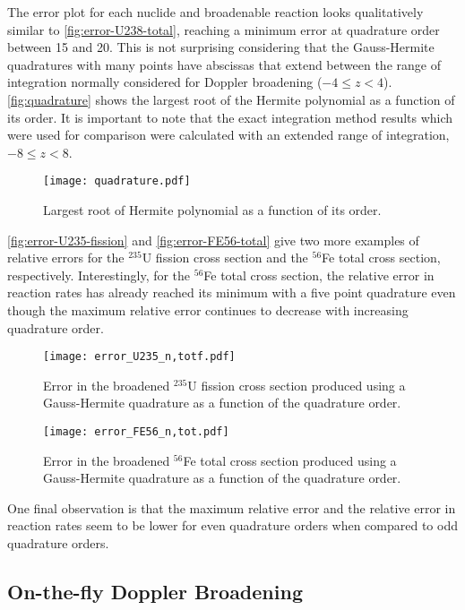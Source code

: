\documentclass[3p,authoryear]{elsarticle}
\begin{document}
The error plot for each nuclide and broadenable reaction looks qualitatively
similar to \autoref{fig:error-U238-total}, reaching a minimum error at
quadrature order between 15 and 20. This is not surprising considering that the
Gauss-Hermite quadratures with many points have abscissas that extend between
the range of integration normally considered for Doppler broadening ($-4 \le z <
4$). \autoref{fig:quadrature} shows the largest root of the Hermite polynomial
as a function of its order. It is important to note that the exact integration
method results which were used for comparison were calculated with an extended
range of integration, $-8 \le z < 8$.
\begin{figure}[H]
  \centering
  \texttt{[image: quadrature.pdf]}
  \caption{Largest root of Hermite polynomial as a function of its order.}
  \label{fig:quadrature}
\end{figure}

\autoref{fig:error-U235-fission} and \autoref{fig:error-FE56-total} give two
more examples of relative errors for the $^{235}$U fission cross section and the
$^{56}$Fe total cross section, respectively. Interestingly, for the $^{56}$Fe
total cross section, the relative error in reaction rates has already reached
its minimum with a five point quadrature even though the maximum relative error
continues to decrease with increasing quadrature order.
\begin{figure}[H]
  \centering
  \texttt{[image: error\_U235\_n,totf.pdf]}
  \caption{Error in the broadened $^{235}$U fission cross section produced using a
    Gauss-Hermite quadrature as a function of the quadrature order.}
  \label{fig:error-U235-fission}
\end{figure}
\begin{figure}[H]
  \centering
  \texttt{[image: error\_FE56\_n,tot.pdf]}
  \caption{Error in the broadened $^{56}$Fe total cross section produced using a
    Gauss-Hermite quadrature as a function of the quadrature order.}
  \label{fig:error-FE56-total}
\end{figure}

One final observation is that the maximum relative error and the relative error
in reaction rates seem to be lower for even quadrature orders when compared to
odd quadrature orders.

\subsection{On-the-fly Doppler Broadening}
\end{document}
